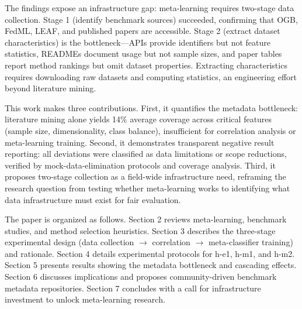 The findings expose an infrastructure gap: meta-learning requires two-stage data collection. Stage 1 (identify benchmark sources) succeeded, confirming that OGB, FedML, LEAF, and published papers are accessible. Stage 2 (extract dataset characteristics) is the bottleneck---APIs provide identifiers but not feature statistics, READMEs document usage but not sample sizes, and paper tables report method rankings but omit dataset properties. Extracting characteristics requires downloading raw datasets and computing statistics, an engineering effort beyond literature mining.

This work makes three contributions. First, it quantifies the metadata bottleneck: literature mining alone yields 14\% average coverage across critical features (sample size, dimensionality, class balance), insufficient for correlation analysis or meta-learning training. Second, it demonstrates transparent negative result reporting: all deviations were classified as data limitations or scope reductions, verified by mock-data-elimination protocols and coverage analysis. Third, it proposes two-stage collection as a field-wide infrastructure need, reframing the research question from testing whether meta-learning works to identifying what data infrastructure must exist for fair evaluation.

The paper is organized as follows. Section 2 reviews meta-learning, benchmark studies, and method selection heuristics. Section 3 describes the three-stage experimental design (data collection $\rightarrow$ correlation $\rightarrow$ meta-classifier training) and rationale. Section 4 details experimental protocols for h-e1, h-m1, and h-m2. Section 5 presents results showing the metadata bottleneck and cascading effects. Section 6 discusses implications and proposes community-driven benchmark metadata repositories. Section 7 concludes with a call for infrastructure investment to unlock meta-learning research.
